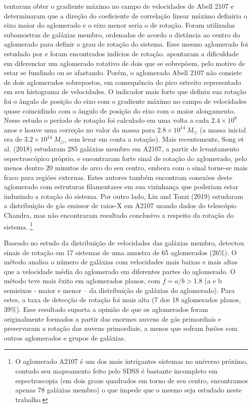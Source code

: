  tentaram obter o gradiente máximo no campo de velocidades de Abell 2107 e determinaram que a direção do coeficiente de correlação linear máximo definiria o eixo maior do aglomerado e o eixo menor seria o de rotação. Foram utilizadas subamostras de galáxias membro, ordenadas de acordo a distância ao centro do aglomerado para definir o grau de rotação do sistema. Esse mesmo aglomerado foi estudado por  e foram encontrados indícios de rotação.  apontaram a dificuldade em diferenciar um aglomerado rotativo de dois que se sobrepõem, pelo motivo de estar se fundindo ou se afastando. Porém, o aglomerado  Abell 2107 não consiste de dois aglomerados sobrepostos, em consequência do pico estreito representado em seu histograma de velocidades. O indicador mais forte que definiu sua rotação foi o ângulo de posição do eixo com o gradiente máximo no campo de velocidades quase coincidindo com o ângulo de posição do eixo com o maior alongamento.  Nesse estudo o período de rotação foi calculado em uma volta a cada $2.4\times10^9$ anos e houve uma correção no valor da massa para $2.8\times10^{14}~{M_\odot}$  (a massa inicial era de $3.2\times10^{14}~{M_\odot}$, sem levar em conta a rotação).  Mais recentemente, Song et al. (2018) estudaram 285 galáxias membro em A2107, a partir de 
levantamento espectroscópico próprio, e encontraram forte sinal de rotação do aglomerado, pelo menos dentro 20 minutos de arco do seu centro,
embora com o sinal torne-se mais fraco para regiões externas. Estes autores também encontram conexões deste aglomerado com
estruturas filamentares em sua vizinhança que poderiam estar induzindo a rotação do sistema. Por outro lado,
Liu and Tozzi (2019) estudaram a distribuição de gás emissor de raios-X em A2107 usando dados do telescópio Chandra, 
mas não encontraram resultado conclusivo a respeito da rotação do sistema. \footnote{O aglomerado A2107 é um dos mais intrigantes
sistemas no universo próximo, contudo seu mapeamento feito pelo SDSS é bastante incompleto em espectroscopia (em dois
graus quadrados em torno de seu centro, encontramos apenas 78 galáxias membro) o que impede que o mesmo seja estudado neste trabalho.} \cite{liu2019testing, song2018redshift}

Baseado no estudo da distribuição de velocidades das galáxias membro,  detectou
sinais de rotação em 17 sistemas de uma amostra de 65 aglomerados (26\%).
O método analisa o número de galáxias com velocidades mais baixas e mais altas que a velocidade média do aglomerado em diferentes partes do aglomerado. O método teve mais êxito em aglomerados planos, com $f=a/b > 1.8$ (a e b semieixos - maior e menor – da distribuição de galáxias do aglomerado). 
Para estes, a taxa de detecção de rotação foi mais alta (7 dos 18 aglomerados planos, 39\%).  Esse resultado suporta a opinião de que os aglomerados foram originalmente formados a partir das enormes nuvens de gás primordiais e preservaram a rotação das nuvens primordiais, a menos que sofram fusões com outros aglomerados e grupos de galáxias. 

